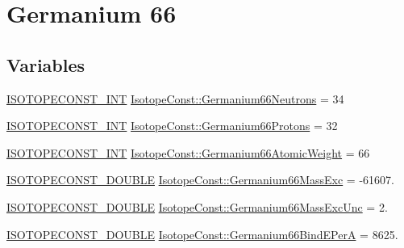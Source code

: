 \hypertarget{group___isotope_const-_germanium-_ge66}{}\section{Germanium 66}
\label{group___isotope_const-_germanium-_ge66}
\subsection*{Variables}
\begin{DoxyCompactItemize}
\item 
\mbox{\hyperlink{group___isotope_const-_macros_ga5f18360b3e99483a35c32d789e62621c}{I\+S\+O\+T\+O\+P\+E\+C\+O\+N\+S\+T\+\_\+\+I\+NT}} \mbox{\hyperlink{group___isotope_const-_germanium-_ge66_ga456696fd33ad0aa26ec985e68cd5ae44}{Isotope\+Const\+::\+Germanium66\+Neutrons}} = 34
\item 
\mbox{\hyperlink{group___isotope_const-_macros_ga5f18360b3e99483a35c32d789e62621c}{I\+S\+O\+T\+O\+P\+E\+C\+O\+N\+S\+T\+\_\+\+I\+NT}} \mbox{\hyperlink{group___isotope_const-_germanium-_ge66_ga744d5f88e3d364402db3495313bf35b3}{Isotope\+Const\+::\+Germanium66\+Protons}} = 32
\item 
\mbox{\hyperlink{group___isotope_const-_macros_ga5f18360b3e99483a35c32d789e62621c}{I\+S\+O\+T\+O\+P\+E\+C\+O\+N\+S\+T\+\_\+\+I\+NT}} \mbox{\hyperlink{group___isotope_const-_germanium-_ge66_ga5a79a5c18a43dc8fc0f6c01451fb5fa7}{Isotope\+Const\+::\+Germanium66\+Atomic\+Weight}} = 66
\item 
\mbox{\hyperlink{group___isotope_const-_macros_ga8f45a7272ce02c0b4c65c44636ed719a}{I\+S\+O\+T\+O\+P\+E\+C\+O\+N\+S\+T\+\_\+\+D\+O\+U\+B\+LE}} \mbox{\hyperlink{group___isotope_const-_germanium-_ge66_ga85a098c3a211c5774fc1c790a7eca160}{Isotope\+Const\+::\+Germanium66\+Mass\+Exc}} = -\/61607.
\item 
\mbox{\hyperlink{group___isotope_const-_macros_ga8f45a7272ce02c0b4c65c44636ed719a}{I\+S\+O\+T\+O\+P\+E\+C\+O\+N\+S\+T\+\_\+\+D\+O\+U\+B\+LE}} \mbox{\hyperlink{group___isotope_const-_germanium-_ge66_ga832d2a741809eb2fdf70a2b471445452}{Isotope\+Const\+::\+Germanium66\+Mass\+Exc\+Unc}} = 2.
\item 
\mbox{\hyperlink{group___isotope_const-_macros_ga8f45a7272ce02c0b4c65c44636ed719a}{I\+S\+O\+T\+O\+P\+E\+C\+O\+N\+S\+T\+\_\+\+D\+O\+U\+B\+LE}} \mbox{\hyperlink{group___isotope_const-_germanium-_ge66_gae30734f23740c9402bd93a40ca09a540}{Isotope\+Const\+::\+Germanium66\+Bind\+E\+PerA}} = 8625.
\item 

\end{DoxyCompactItemize}
